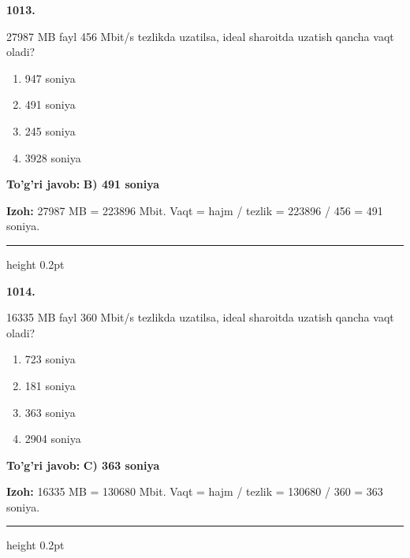 \documentclass[10pt,a4paper,oneside]{article}
\begin{document}
\noindent\textbf{\color{ink}1013.}
\par
27987 MB fayl 456 Mbit/s tezlikda uzatilsa, ideal sharoitda uzatish qancha vaqt oladi?
\begin{enumerate}[label=\Alph*),leftmargin=9mm]
\item 947 soniya
\item 491 soniya
\item 245 soniya
\item 3928 soniya
\end{enumerate}
\begin{tcolorbox}[enhanced,breakable,colback=teal!4,colframe=teal!50!black,boxrule=0.5pt,arc=1.1mm,left=3mm,right=3mm,top=1.7mm,bottom=1.7mm,before skip=2mm,after skip=2mm]
\textbf{\color{teal}To'g'ri javob:} \textbf{B) 491 soniya}
\par\smallskip
\textbf{Izoh:} 27987 MB = 223896 Mbit. Vaqt = hajm / tezlik = 223896 / 456 = 491 soniya.
\end{tcolorbox}
\vspace{2mm}\hrule height 0.2pt \vspace{3mm}

\noindent\textbf{\color{ink}1014.}
\par
16335 MB fayl 360 Mbit/s tezlikda uzatilsa, ideal sharoitda uzatish qancha vaqt oladi?
\begin{enumerate}[label=\Alph*),leftmargin=9mm]
\item 723 soniya
\item 181 soniya
\item 363 soniya
\item 2904 soniya
\end{enumerate}
\begin{tcolorbox}[enhanced,breakable,colback=teal!4,colframe=teal!50!black,boxrule=0.5pt,arc=1.1mm,left=3mm,right=3mm,top=1.7mm,bottom=1.7mm,before skip=2mm,after skip=2mm]
\textbf{\color{teal}To'g'ri javob:} \textbf{C) 363 soniya}
\par\smallskip
\textbf{Izoh:} 16335 MB = 130680 Mbit. Vaqt = hajm / tezlik = 130680 / 360 = 363 soniya.
\end{tcolorbox}
\vspace{2mm}\hrule height 0.2pt \vspace{3mm}
\end{document}
